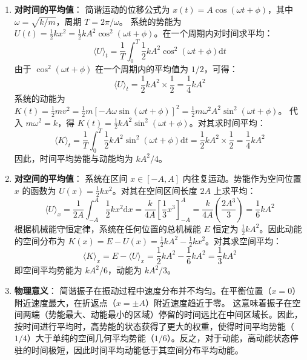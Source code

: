 \begin{solution}
\begin{enumerate}
    \item[(a)] \textbf{对时间的平均值}：
    简谐运动的位移公式为 $x(t) = A \cos(\omega t + \phi)$，其中 $\omega = \sqrt{k/m}$，周期 $T = 2\pi/\omega$。
    系统的势能为 $U(t) = \frac{1}{2} k x^2 = \frac{1}{2} k A^2 \cos^2(\omega t + \phi)$。在一个周期内对时间求平均：
    $$ \langle U \rangle_t = \frac{1}{T} \int_0^T \frac{1}{2} k A^2 \cos^2(\omega t + \phi) \mathrm{d}t $$
    由于 $\cos^2(\omega t + \phi)$ 在一个周期内的平均值为 $1/2$，可得：
    $$ \langle U \rangle_t = \frac{1}{2} k A^2 \times \frac{1}{2} = \frac{1}{4} k A^2 $$
    系统的动能为 $K(t) = \frac{1}{2} m v^2 = \frac{1}{2} m \left[ -A\omega \sin(\omega t + \phi) \right]^2 = \frac{1}{2} m \omega^2 A^2 \sin^2(\omega t + \phi)$。
    代入 $m\omega^2 = k$，得 $K(t) = \frac{1}{2} k A^2 \sin^2(\omega t + \phi)$。对其求时间平均：
    $$ \langle K \rangle_t = \frac{1}{T} \int_0^T \frac{1}{2} k A^2 \sin^2(\omega t + \phi) \mathrm{d}t = \frac{1}{2} k A^2 \times \frac{1}{2} = \frac{1}{4} k A^2 $$
    因此，时间平均势能与动能均为 $k A^2 / 4$。

    \item[(b)] \textbf{对空间的平均值}：
    系统在区间 $x \in [-A, A]$ 内往复运动。势能作为空间位置 $x$ 的函数为 $U(x) = \frac{1}{2} k x^2$。对其在空间区间长度 $2A$ 上求平均：
    $$ \langle U \rangle_x = \frac{1}{2A} \int_{-A}^A \frac{1}{2} k x^2 \mathrm{d}x = \frac{k}{4A} \left[ \frac{1}{3} x^3 \right]_{-A}^A = \frac{k}{4A} \left( \frac{2A^3}{3} \right) = \frac{1}{6} k A^2 $$
    根据机械能守恒定律，系统在任何位置的总机械能 $E$ 恒定为 $\frac{1}{2} k A^2$。因此动能的空间分布为 $K(x) = E - U(x) = \frac{1}{2} k A^2 - \frac{1}{2} k x^2$。对其求空间平均：
    $$ \langle K \rangle_x = E - \langle U \rangle_x = \frac{1}{2} k A^2 - \frac{1}{6} k A^2 = \frac{1}{3} k A^2 $$
    即空间平均势能为 $kA^2/6$，动能为 $kA^2/3$。

    \item[(c)] \textbf{物理意义}：
    简谐振子在振动过程中速度分布并不均匀。在平衡位置（$x=0$）附近速度最大，在折返点（$x = \pm A$）附近速度趋近于零。
    这意味着振子在空间两端（势能最大、动能最小的区域）停留的时间远比在中间区域长。因此，按时间进行平均时，高势能的状态获得了更大的权重，使得时间平均势能（$1/4$）大于单纯的空间几何平均势能（$1/6$）。反之，对于动能，高动能状态停驻的时间极短，因此时间平均动能低于其空间分布平均动能。
\end{enumerate}
\end{solution}

